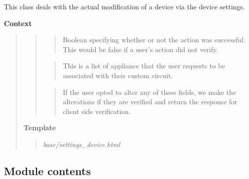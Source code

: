 \documentclass[letterpaper,10pt,english]{sphinxmanual}
\begin{document}
\begin{fulllineitems}
\label{modules/webapp:webapp.views.settings_dashboard}
\end{fulllineitems}


\begin{fulllineitems}
\label{modules/webapp:webapp.views.settings_device}
This class deals with the actual modification of a device
via the device settings.

\textbf{Context}
\begin{quote}
\begin{quote}

\begin{quote}

Boolean specifying whether or not the action was successful.
This would be false if a user's action did not verify.
\end{quote}

\begin{quote}

This is a list of appliance that the user requests to be
associated with their custom circuit.
\end{quote}

  
\begin{quote}

If the user opted to alter any of these fields,
we make the alterations if they are verified
and return the response for client side verification.
\end{quote}
\end{quote}

\textbf{Template}
\begin{quote}

\emph{base/settings\_device.html}
\end{quote}
\end{quote}

\end{fulllineitems}



\subsection{Module contents}
\label{modules/webapp:module-webapp}\label{modules/webapp:module-contents}
\end{document}
